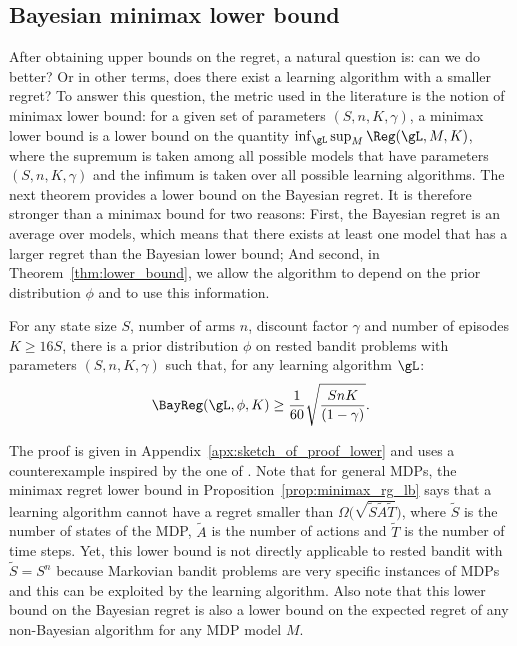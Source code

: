 \subsection{Bayesian minimax lower bound}
\label{ssec:lowerbound}

After obtaining upper bounds on the regret, a natural question is: can we do better? Or in other terms, does there exist a learning algorithm with a smaller regret? To answer this question, the metric used in the literature is the notion of minimax lower bound: for a given set of parameters $(S,n,K,\gamma)$, a minimax lower bound is a lower bound on the quantity 
$\inf_{\gL}\sup_{M}\Reg(\gL,M,K)$,  where the supremum is taken among all possible models that have parameters $(S,n,K,\gamma)$ and the infimum is taken over all possible learning algorithms. The next theorem provides a lower bound on the Bayesian regret. It is therefore stronger than a minimax bound for two reasons: First, the Bayesian regret is an average over models, which means that there exists at least one model that has a larger regret than the Bayesian lower bound; And second,  in Theorem~\ref{thm:lower_bound}, we allow the algorithm to depend on the prior distribution $\phi$ and to use this information.
\begin{thm}
    \label{thm:lower_bound}
    For any state size $S$, number of arms $n$, discount factor $\gamma$ and number of episodes $K\ge 16S$, there is a prior distribution $\phi$ on rested bandit problems with parameters $(S,n,K,\gamma)$ such that, for any learning algorithm $\gL$:
    \begin{align}
        \label{eq:thm2}
        \BayReg(\gL,\phi,K) \geq \frac1{60}\sqrt{\frac{{SnK}}{(1-\gamma)}}.
    \end{align}
\end{thm}
The proof is given in Appendix~\ref{apx:sketch_of_proof_lower} and uses a counterexample inspired by the one of \cite{jaksch2010near}. Note that for general MDPs, the minimax regret lower bound in Proposition~\ref{prop:minimax_rg_lb} says that a learning algorithm cannot have a regret smaller than $\Omega\big(\sqrt{\tilde{S}\tilde{A}\tilde{T}}\big)$, where $\tilde{S}$ is the number of states of the MDP, $\tilde{A}$ is the number of actions and $\tilde{T}$ is the number of time steps. 
Yet, this lower bound is not directly applicable to rested bandit with $\tilde{S}=S^n$ because Markovian bandit problems are very specific instances of MDPs and this can be exploited by the  learning algorithm.
Also note that this lower bound on the Bayesian regret is also a lower bound on the expected regret of any non-Bayesian algorithm for any MDP model $M$.


